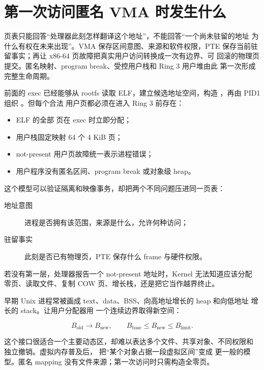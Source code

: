 \section{第一次访问匿名 VMA 时发生什么}

页表只能回答“处理器此刻怎样翻译这个地址”，不能回答“一个尚未驻留的地址
为什么有权在未来出现”。VMA 保存区间意图、来源和软件权限，PTE
保存当前驻留事实；再让 x86-64 页故障把真实用户访问转换成一次有边界、可
回滚的物理页提交。匿名映射、program break、受控用户栈和 Ring 3 用户堆由此
第一次形成完整生命周期。

前面的 exec 已经能够从 rootfs 读取 ELF，建立候选地址空间，构造
，再由 PID1 组织 。但每个合法
用户页都必须在进入 Ring 3 前存在：

\begin{itemize}
  \item ELF 的全部  页在 exec 时立即分配；
  \item 用户栈固定映射 64 个 4 KiB 页；
  \item not-present 用户页故障统一表示进程错误；
  \item 用户程序没有匿名区间、program break 或对象级 heap。
\end{itemize}

这个模型可以验证隔离和映像事务，却把两个不同问题压进同一页表：

\begin{description}
  \item[地址意图] 进程是否拥有该范围，来源是什么，允许何种访问；
  \item[驻留事实] 此刻是否已有物理页，PTE 保存什么 frame 与硬件权限。
\end{description}

若没有第一层，处理器报告一个 not-present 地址时，Kernel 无法知道应该分配
零页、读取文件、复制 COW 页、增长栈，还是把它当作越界终止。

早期 Unix 进程常被画成 text、data、BSS、向高地址增长的 heap 和向低地址
增长的 stack。让用户分配器用
一个连续边界取得新空间：

\[
  B_{\mathrm{old}}\longrightarrow B_{\mathrm{new}},
  \qquad B_{\mathrm{base}}\le B_{\mathrm{new}}\le B_{\mathrm{limit}}.
\]

这个接口很适合一个主要动态区，却难以表达多个文件、共享对象、不同权限和
独立撤销。虚拟内存普及后， 把“某个对象占据一段虚拟区间”变成
更一般的模型。匿名 mapping 没有文件来源；第一次访问时只需构造全零页。

